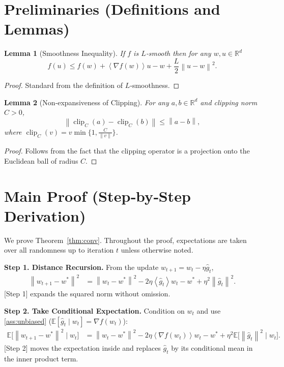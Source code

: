 \documentclass{article}
\newcommand{\R}{\mathbb{R}}
\newcommand{\E}{\mathbb{E}}
\newcommand{\norm}[1]{\left\lVert #1\right\rVert}
\newcommand{\inner}[1]{\left\langle #1\right\rangle}
\newtheorem{lemma}{Lemma}
\begin{document}
\newpage

\section*{Preliminaries (Definitions and Lemmas)}
\begin{lemma}[Smoothness Inequality]\label{lem:smooth}
If $f$ is $L$‑smooth then for any $w,u\in\R^{d}$
\[
f(u)\le f(w)+\inner{\nabla f(w)}{u-w}+\frac{L}{2}\norm{u-w}^{2}.
\]
\end{lemma}
\begin{proof}
Standard from the definition of $L$‑smoothness. \qedhere
\end{proof}

\begin{lemma}[Non‑expansiveness of Clipping]\label{lem:clip}
For any $a,b\in\R^{d}$ and clipping norm $C>0$,
\[
\norm{\operatorname{clip}_{C}(a)-\operatorname{clip}_{C}(b)}\le \norm{a-b},
\]
where $\operatorname{clip}_{C}(v)=v\min\{1,\frac{C}{\norm{v}}\}$.
\end{lemma}
\begin{proof}
Follows from the fact that the clipping operator is a projection onto the Euclidean ball of radius $C$. \qedhere
\end{proof}

\section*{Main Proof (Step‑by‑Step Derivation)}
We prove Theorem~\ref{thm:conv}. Throughout the proof, expectations are taken over all randomness up to iteration $t$ unless otherwise noted.

\bigskip
\noindent\textbf{Step 1. Distance Recursion.}  
From the update $w_{t+1}=w_t-\eta\hat g_t$,
\begin{align}
\norm{w_{t+1}-w^{*}}^{2}
&=\norm{w_t-w^{*}}^{2}
-2\eta\inner{\hat g_t}{w_t-w^{*}}
+\eta^{2}\norm{\hat g_t}^{2}. \tag{1}\label{eq:dist}
\end{align}
[Step 1] expands the squared norm without omission.

\bigskip
\noindent\textbf{Step 2. Take Conditional Expectation.}  
Condition on $w_t$ and use \ref{ass:unbiased} ($\E[\hat g_t\mid w_t]=\nabla f(w_t)$):
\begin{align}
\E\!\big[\norm{w_{t+1}-w^{*}}^{2}\mid w_t\big]
&=\norm{w_t-w^{*}}^{2}
-2\eta\inner{\nabla f(w_t)}{w_t-w^{*}}
+\eta^{2}\E\!\big[\norm{\hat g_t}^{2}\mid w_t\big]. \tag{2}\label{eq:cond}
\end{align}
[Step 2] moves the expectation inside and replaces $\hat g_t$ by its conditional mean in the inner product term.
\end{document}
